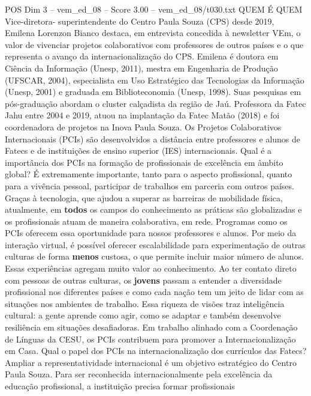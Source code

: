 \begin{textsample}{POS Dim 3 – vem\_ed\_08 – Score 3.00 – vem\_ed\_08/t030.txt}  \label{ex:f3_pos_009}
QUEM É QUEM Vice-diretora- superintendente do Centro Paula Souza (CPS) desde 2019, Emilena Lorenzon Bianco destaca, em entrevista concedida à newsletter VEm, o valor de vivenciar projetos colaborativos com professores de outros países e o que representa o avanço da internacionalização do CPS.
Emilena é doutora em Ciência da Informação (Unesp, 2011), mestra em Engenharia de Produção (UFSCAR, 2004), especialista em Uso Estratégico das Tecnologias da Informação (Unesp, 2001) e graduada em Biblioteconomia (Unesp, 1998).
Suas pesquisas em pós-graduação abordam o cluster calçadista da região de Jaú.
Professora da Fatec Jahu entre 2004 e 2019, atuou na implantação da Fatec Matão (2018) e foi coordenadora de projetos na Inova Paula Souza.
Os Projetos Colaborativos Internacionais (PCIs) são desenvolvidos a distância entre professores e alunos de Fatecs e de instituições de ensino superior (IES) internacionais.
Qual é a importância dos PCIs na formação de profissionais de excelência em âmbito global?
É extremamente importante, tanto para o aspecto profissional, quanto para a vivência pessoal, participar de trabalhos em parceria com outros países.
Graças à tecnologia, que ajudou a superar as barreiras de mobilidade física, atualmente, em \textbf{todos} os campos do conhecimento as práticas são globalizadas e os profissionais atuam de maneira colaborativa, em rede.
Programas como os PCIs oferecem essa oportunidade para nossos professores e alunos.
Por meio da interação virtual, é possível oferecer escalabilidade para experimentação de outras culturas de forma \textbf{menos} custosa, o que permite incluir maior número de alunos.
Essas experiências agregam muito valor ao conhecimento.
Ao ter contato direto com pessoas de outras culturas, os \textbf{jovens} passam a entender a diversidade profissional nos diferentes países e como cada nação tem um jeito de lidar com as situações nos ambientes de trabalho.
Essa riqueza de visões traz inteligência cultural: a gente aprende como agir, como se adaptar e também desenvolve resiliência em situações desafiadoras.
Em trabalho alinhado com a Coordenação de Línguas da CESU, os PCIs contribuem para promover a Internacionalização em Casa.
Qual o papel dos PCIs na internacionalização dos currículos das Fatecs?
Ampliar a representatividade internacional é um objetivo estratégico do Centro Paula Souza.
Para ser reconhecida internacionalmente pela excelência da educação profissional, a instituição precisa formar profissionais

\end{textsample}
